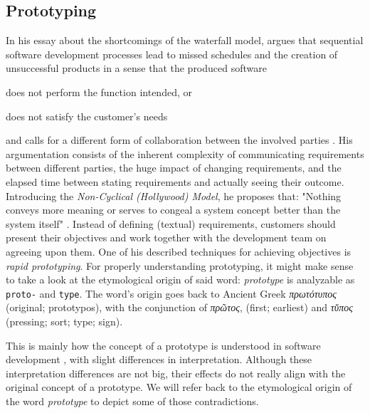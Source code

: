 \subsection{Prototyping}
In his essay  \cite{gladden_stop_1982} about the shortcomings of the waterfall model, \citeauthor{gladden_stop_1982} argues that sequential software development processes lead to missed schedules and the creation of unsuccessful products in a sense that the produced software \begin{enumerate*}[label=(\roman*)]
\item does not perform the function intended, or
\item does not satisfy the customer's needs
\end{enumerate*}
and calls for a different form of collaboration between the involved parties \cite{gladden_stop_1982}.
His argumentation consists of the inherent complexity of communicating requirements between different parties, the huge impact of changing requirements, and the elapsed time between stating requirements and actually seeing their outcome.
Introducing the \emph{Non-Cyclical (Hollywood) Model}, he proposes that: "Nothing conveys more meaning or serves to congeal a system concept better than the system itself" \cite{gladden_stop_1982}.
Instead of defining (textual) requirements, customers should present their objectives and work together with the development team on agreeing upon them.
One of his described techniques for achieving objectives is \emph{rapid prototyping}.
For properly understanding prototyping, it might make sense to take a look at the etymological origin of said word: \emph{prototype} is analyzable as \texttt{proto-} and \texttt{type}.
The word's origin goes back to Ancient Greek \emph{\textgreek{πρωτότυπος}} (original; prototypos), with the conjunction of \emph{\textgreek{πρῶτος}}, (first; earliest) and \emph{\textgreek{τῠπος}} (pressing; sort; type; sign). %

This is mainly how the concept of a prototype is understood in software development \cite{budde_what_1992}, with slight differences in interpretation.
Although these interpretation differences are not big, their effects do not really align with the original concept of a prototype.
We will refer back to the etymological origin of the word \emph{prototype} to depict some of those contradictions.

